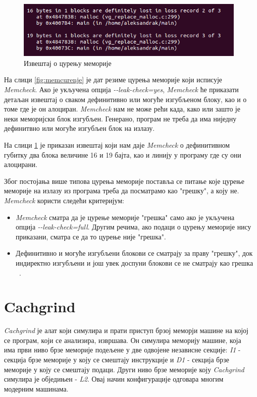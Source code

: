 \documentclass[12pt,oneside]{memoir}
\begin{document}
\begin{figure}[h!]
\begin{center}
\includegraphics[scale=0.75]{slika9.png}
\end{center}
\caption{Извештај о цурењу меморије}
\label{fig:memizv}
\end{figure}


\indent На слици \ref{fig:memcurenje} је дат резиме цурења меморије који исписује \textit{Memcheck}. Ако је укључена опција \textit{-\--leak-check=yes}, \textit{Memcheck} ће приказати детаљан извештај о сваком дефинитивно или могуће изгубљеном блоку,  као и о томе где је он алоциран. \textit{Memcheck} нам не може рећи када, како или зашто је неки меморијски блок изгубљен. Генерано, програм не треба да има ниједну дефинитвно или могуће изгубљен блок на излазу.

\indent На слици \ref{fig:memizv} је приказан извештај који нам даје \textit{Memcheck} о дефинитивном губитку два блока величине 16 и 19 бајта, као и линију у програму где су они алоцирани.

\indent Због постојања више типова цурења меморије поставља се питање које цурење меморије на излазу из програма треба да посматрамо као "грешку", а коју не. \textit{Memcheck} користи следећи критеријум:

\begin{itemize}
  \item \textit{Memcheck} сматра да је цурење меморије "грешка" само ако је укључена опција \textit{-\--leak-check=full}. Другим речима, ако подаци о цурењу меморије нису приказани, сматра се да то цурење није "грешка".
  \item Дефинитивно и могуће изгубљени блокови се сматрају за праву "грешку", док индиректно изгубљени и још увек доспуни блокови се не сматрају као грешка ~\cite{memcheckRef}.
\end{itemize}


\section{Cachgrind}
\label{section_cachgrind}

\indent \textit{Cachgrind} је алат који симулира и прати приступ брзој меморји машине на којој се програм, који се анализира, извршава. Он симулира меморију машине, која има први ниво брзе меморије подељене у две одвојене независне секције: \textit{I1} - секција брзе меморије у коју се смештају инструкције и \textit{D1} - секција брзе меморије у коју се смештају подаци. Други ниво брзе меморије коју \textit{Cachgrind} симулира је обједињен - \textit{L2}. Овај начин конфигурације одговара многим модерним машинама.
\end{document}
